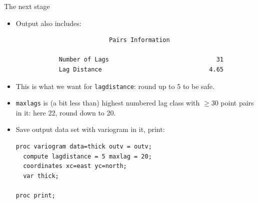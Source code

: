 \begin{frame}[fragile]{The next stage}

  \begin{itemize}
  \item Output also includes:

{\scriptsize
\begin{verbatim}
                          Pairs Information

            Number of Lags                              31
            Lag Distance                              4.65
\end{verbatim}
}

\item This is what we want for \texttt{lagdistance}: round up to 5 to
  be safe.
\item \texttt{maxlags} is (a bit less than) highest numbered lag class
  with $\ge 30$ point pairs in it: here 22, round down to 20.
\item Save output data set with variogram in it, print:

\begin{verbatim}
proc variogram data=thick outv = outv; 
  compute lagdistance = 5 maxlag = 20; 
  coordinates xc=east yc=north; 
  var thick;

proc print;

\end{verbatim}

  \end{itemize}
  
\end{frame}

